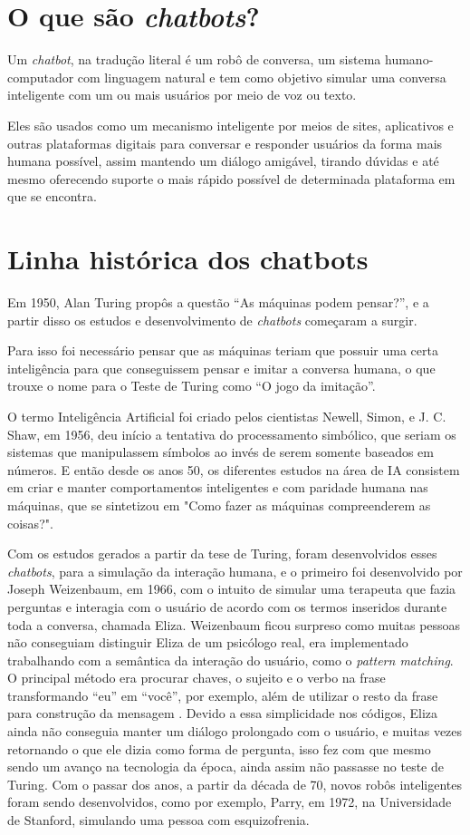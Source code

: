 \documentclass[
	12pt,				%
	oneside,
	a4paper,			%
	english,			%
	french,				%
	spanish,			%
	brazil				%
	]{abntex2}
\begin{document}
\section{O que são \emph{chatbots}?}
Um \emph{chatbot}, na tradução literal é um robô de conversa, um sistema humano-computador com linguagem natural e tem como objetivo simular uma conversa inteligente com um ou mais usuários por meio de voz ou texto. 

Eles são usados como um mecanismo inteligente por meios de sites, aplicativos e outras plataformas digitais para conversar e responder usuários da forma mais humana possível, assim mantendo um diálogo amigável, tirando dúvidas e até mesmo oferecendo suporte o mais rápido possível de determinada plataforma em que se encontra.

\section{Linha histórica dos chatbots}
Em 1950, Alan Turing propôs a questão “As máquinas podem pensar?”, e a partir disso os estudos e desenvolvimento de \emph{chatbots} começaram a surgir.

Para isso foi necessário pensar que as máquinas teriam que possuir uma certa inteligência para que conseguissem pensar e imitar a conversa humana, o que trouxe o nome para o Teste de Turing como “O jogo da imitação”.

O termo Inteligência Artificial foi criado pelos cientistas Newell, Simon, e J. C. Shaw, em 1956, deu início a tentativa do processamento simbólico, que seriam os sistemas que manipulassem símbolos ao invés de serem somente baseados em números.
E então desde os anos 50, os diferentes estudos na área de IA consistem em criar e manter comportamentos inteligentes e com paridade humana nas máquinas, que se sintetizou em "Como fazer as máquinas compreenderem as coisas?"\supercite{minsky}.

Com os estudos gerados a partir da tese de Turing, foram desenvolvidos esses \emph{chatbots}, para a simulação da interação humana, e o primeiro foi desenvolvido por Joseph Weizenbaum, em 1966, com o intuito de simular uma terapeuta que fazia perguntas e interagia com o usuário de acordo com os termos inseridos durante toda a conversa, chamada Eliza.
Weizenbaum ficou surpreso como muitas pessoas não conseguiam distinguir Eliza de um psicólogo real, era implementado trabalhando com a semântica da interação do usuário, como o \emph{pattern matching}. O principal método era procurar chaves, o sujeito e o verbo na frase transformando “eu” em “você”, por exemplo, além de utilizar o resto da frase para construção da mensagem \supercite{weizenbaum-eliza}. Devido a essa simplicidade nos códigos, Eliza ainda não conseguia manter um diálogo prolongado com o usuário, e muitas vezes retornando o que ele dizia como forma de pergunta, isso fez com que mesmo sendo um avanço na tecnologia da época, ainda assim não passasse no teste de Turing.
Com o passar dos anos, a partir da década de 70, novos robôs inteligentes foram sendo desenvolvidos, como por exemplo, Parry, em 1972, na Universidade de Stanford, simulando uma pessoa com esquizofrenia. 
\end{document}
